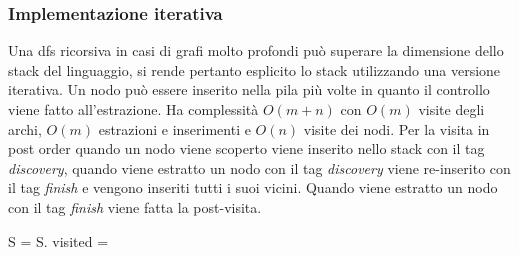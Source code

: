 \subsubsection{Implementazione iterativa}
Una dfs ricorsiva in casi di grafi molto profondi pu\`o superare la dimensione dello stack del linguaggio, si rende pertanto esplicito lo stack utilizzando 
una versione iterativa. Un nodo pu\`o essere inserito nella pila pi\`u volte in quanto il controllo viene fatto all'estrazione. Ha complessit\`a $O(m+n)$ 
con $O(m)$ visite degli archi, $O(m)$ estrazioni e inserimenti e $O(n)$ visite dei nodi. Per la visita in post order quando un nodo viene scoperto viene
inserito nello stack con il tag \emph{discovery}, quando viene estratto un nodo con il tag \emph{discovery} viene re-inserito con il tag \emph{finish} e 
vengono inseriti tutti i suoi vicini. Quando viene estratto un nodo con il tag \emph{finish} viene fatta la post-visita.
\begin{algorithm}
\DontPrintSemicolon
{}
\caption{\protect{}}

\Set S = \SetCos{} \;
S.\;
\Boolean[] visited = \New \Boolean[G.\Size{}]\;

\end{algorithm}
\newpage
